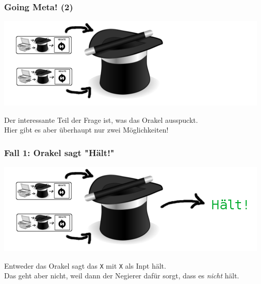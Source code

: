 \documentclass[aspectratio=169]{beamer}
\begin{document}
\begin{frame}
\frametitle{Going Meta! (2)}

\begin{center}
\includegraphics[scale=1.4]{images/input_hat_nothing.png} 
\bigskip

Der interessante Teil der Frage ist, was das Orakel ausspuckt.\\
Hier gibt es aber überhaupt nur zwei Möglichkeiten!
\end{center}
\end{frame}


\begin{frame}
\frametitle{Fall 1: Orakel sagt "Hält!"}

\begin{center}
\includegraphics[scale=1.4]{images/input_hat_halts.png} 
\bigskip

Entweder das Orakel sagt das \texttt{X} mit \texttt{X} als Inpt hält.\\ Das geht aber nicht, weil dann der Negierer dafür sorgt, dass es \emph{nicht} hält.
\end{center}
\end{frame}

\end{document}
